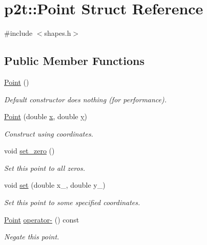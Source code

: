 \hypertarget{structp2t_1_1_point}{}\section{p2t\+:\+:Point Struct Reference}
\label{structp2t_1_1_point}


{\ttfamily \#include $<$shapes.\+h$>$}

\subsection*{Public Member Functions}
\begin{DoxyCompactItemize}
\item 
\hyperlink{structp2t_1_1_point_a7e573e8b3c263b088a2141d4977850b7}{Point} ()
\begin{DoxyCompactList}\small\item\em Default constructor does nothing (for performance). \end{DoxyCompactList}\item 
\hyperlink{structp2t_1_1_point_a60c0ed4b0d109b9172a50555220ebdc3}{Point} (double \hyperlink{structp2t_1_1_point_a49ca18e331005473fabe8352ae30aa87}{x}, double \hyperlink{structp2t_1_1_point_ac145d2fc2a314ba5d1f5f93b32888313}{y})
\begin{DoxyCompactList}\small\item\em Construct using coordinates. \end{DoxyCompactList}\item 
void \hyperlink{structp2t_1_1_point_ac0b05395a17be952b6ea580495c9d11b}{set\+\_\+zero} ()
\begin{DoxyCompactList}\small\item\em Set this point to all zeros. \end{DoxyCompactList}\item 
void \hyperlink{structp2t_1_1_point_aa8a3a62cc47e65e0f717679adf12fd4e}{set} (double x\+\_\+, double y\+\_\+)
\begin{DoxyCompactList}\small\item\em Set this point to some specified coordinates. \end{DoxyCompactList}\item 
\hyperlink{structp2t_1_1_point}{Point} \hyperlink{structp2t_1_1_point_a64b9a6ab804f3dd940d88aedcde92b41}{operator-\/} () const 
\begin{DoxyCompactList}\small\item\em Negate this point. \end{DoxyCompactList}\item 

\end{DoxyCompactItemize}
